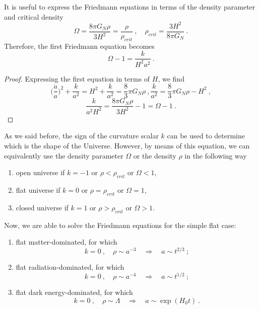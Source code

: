     It is useful to express the Friedmann equations in terms of the density parameter and critical density
    \begin{equation*}
        \Omega = \frac{8 \pi G_N \rho}{3 H^2} = \frac{\rho}{\rho_{crit}} ~, \quad \rho_{crit} = \frac{3 H^2}{8 \pi G_N} ~.
    \end{equation*}
    Therefore, the first Friedmann equation becomes 
    \begin{equation*}
        \Omega - 1 = \frac{k}{H^2 a^2} ~.
    \end{equation*}
    \begin{proof}
        Expressing the first equation in terms of $H$, we find
        \begin{equation*}
            \Big ( \frac{\dot a}{a} \Big)^2 + \frac{k}{a^2} = H^2 + \frac{k}{a^2} = \frac{8}{3} \pi G_N \rho ~, \frac{k}{a^2} = \frac{8}{3} \pi G_N \rho - H^2 ~,
        \end{equation*}
        \begin{equation*}
            \frac{k}{a^2 H^2} = \frac{8 \pi G_N \rho}{3 H^2} - 1 = \Omega - 1 ~.
        \end{equation*}
    \end{proof}
    \noindent As we said before, the sign of the curvature scalar $k$ can be used to determine which is the shape of the Universe. However, by means of this equation, we can equivalently use the density parameter $\Omega$ or the density $\rho$ in the following way
    \begin{enumerate}
        \item open universe if $k = -1$ or $\rho < \rho_{crit}$ or $\Omega < 1$, 
        \item flat universe if $k = 0$  or $\rho = \rho_{crit}$ or $\Omega = 1$, 
        \item closed universe if $k = 1$ or $\rho > \rho_{crit}$ or $\Omega > 1$.
    \end{enumerate}
    Now, we are able to solve the Friedmann equations for the simple flat case: 
    \begin{enumerate}
        \item flat matter-dominated, for which
            \begin{equation*}
                k = 0 ~, \quad \rho \sim a^{-3} \quad \Rightarrow \quad a \sim t^{2/3} ~;
            \end{equation*}
        \item flat radiation-dominated, for which
            \begin{equation*}
                k = 0 ~, \quad \rho \sim a^{-4} \quad \Rightarrow \quad a \sim t^{1/2} ~;
            \end{equation*}
        \item flat dark energy-dominated, for which
            \begin{equation*}
                k = 0 ~, \quad \rho \sim \Lambda \quad \Rightarrow \quad a \sim \exp(H_0 t) ~.
            \end{equation*}
    \end{enumerate}

